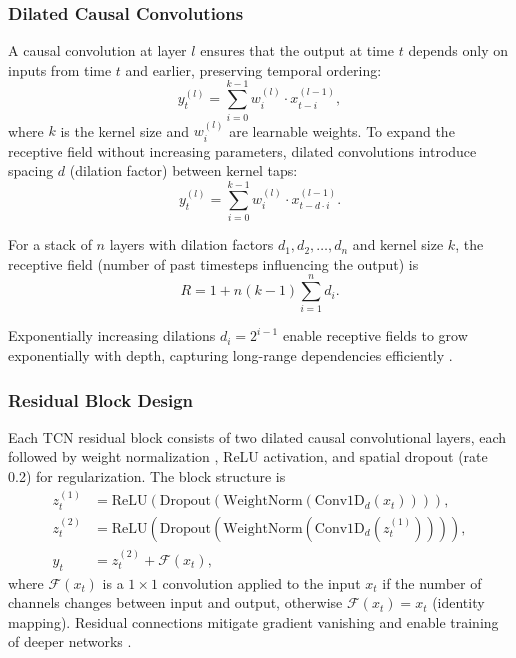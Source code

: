\subsubsection{Dilated Causal Convolutions}

A causal convolution at layer $l$ ensures that the output at time $t$ depends only on inputs from time $t$ and earlier, preserving temporal ordering:
\begin{equation}
y_t^{(l)} = \sum_{i=0}^{k-1} w_i^{(l)} \cdot x_{t-i}^{(l-1)},
\label{eq:causal_conv}
\end{equation}
where $k$ is the kernel size and $w_i^{(l)}$ are learnable weights. To expand the receptive field without increasing parameters, dilated convolutions introduce spacing $d$ (dilation factor) between kernel taps:
\begin{equation}
y_t^{(l)} = \sum_{i=0}^{k-1} w_i^{(l)} \cdot x_{t - d \cdot i}^{(l-1)}.
\label{eq:dilated_conv}
\end{equation}

For a stack of $n$ layers with dilation factors $d_1, d_2, \ldots, d_n$ and kernel size $k$, the receptive field (number of past timesteps influencing the output) is
\begin{equation}
R = 1 + n(k-1) \sum_{i=1}^{n} d_i.
\label{eq:receptive_field}
\end{equation}

Exponentially increasing dilations $d_i = 2^{i-1}$ enable receptive fields to grow exponentially with depth, capturing long-range dependencies efficiently \cite{bai2018tcn}.

\subsubsection{Residual Block Design}

Each TCN residual block consists of two dilated causal convolutional layers, each followed by weight normalization \cite{salimans2016weightnorm}, ReLU activation, and spatial dropout (rate 0.2) for regularization. The block structure is
\begin{align}
z_t^{(1)} &= \text{ReLU}\left( \text{Dropout}\left( \text{WeightNorm}\left( \text{Conv1D}_{d}(x_t) \right) \right) \right), \label{eq:tcn_block_1} \\
z_t^{(2)} &= \text{ReLU}\left( \text{Dropout}\left( \text{WeightNorm}\left( \text{Conv1D}_{d}(z_t^{(1)}) \right) \right) \right), \label{eq:tcn_block_2} \\
y_t &= z_t^{(2)} + \mathcal{F}(x_t), \label{eq:tcn_residual}
\end{align}
where $\mathcal{F}(x_t)$ is a $1 \times 1$ convolution applied to the input $x_t$ if the number of channels changes between input and output, otherwise $\mathcal{F}(x_t) = x_t$ (identity mapping). Residual connections mitigate gradient vanishing and enable training of deeper networks \cite{he2016resnet}.

